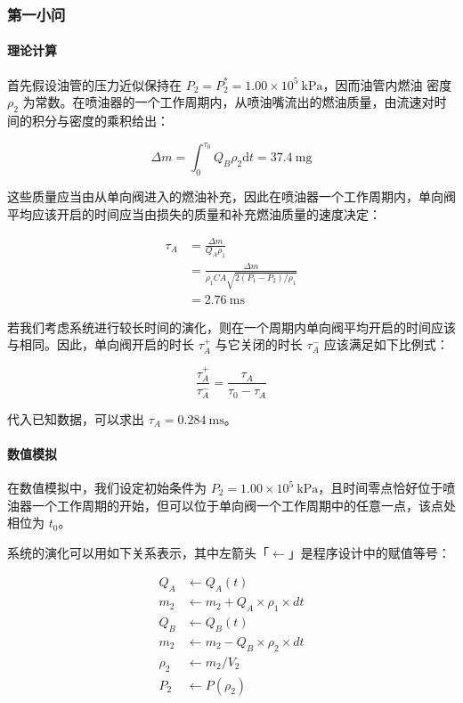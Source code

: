 \documentclass[18pt]{ctexart}
\newcommand{\prb}{\times 10^5~\mathrm{kPa}}
\newcommand{\tim}{~\mathrm{ms}}
\newcommand{\mas}{~\mathrm{mg}}
\begin{document}
\subsubsection{第一小问}
\paragraph{理论计算}
首先假设油管的压力近似保持在 $P_2=P_2^*=1.00\prb$，因而油管内燃油 密度 $\rho_2$ 为常数。在喷油器的一个工作周期内，从喷油嘴流出的燃油质量，由流速对时间的积分与密度的乘积给出：

$$
\Delta m=\int_0^{\tau_0}Q_B\rho_2\mathrm dt=37.4\mas
$$

这些质量应当由从单向阀进入的燃油补充，因此在喷油器一个工作周期内，单向阀平均应该开启的时间应当由损失的质量和补充燃油质量的速度决定：

$$
\begin{aligned}
\tau_A&=\frac{\Delta m}{Q_A\rho_1}\\
&=\frac{\Delta m}{\rho_1CA\sqrt{2(P_1-P_2)/\rho_1}}\\
&=2.76\tim
\end{aligned}
$$

若我们考虑系统进行较长时间的演化，则在一个周期内单向阀平均开启的时间应该与相同。因此，单向阀开启的时长 $\tau_A^+$ 与它关闭的时长 $\tau_A^-$ 应该满足如下比例式：

$$
\frac{\tau_A^+}{\tau_A^-}=\frac{\tau_A}{\tau_0-\tau_A}
$$

代入已知数据，可以求出 $\tau_A=0.284\tim$。

\paragraph{数值模拟}

在数值模拟中，我们设定初始条件为 $P_2=1.00\prb$，且时间零点恰好位于喷油器一个工作周期的开始，但可以位于单向阀一个工作周期中的任意一点，该点处相位为 $t_0$。

系统的演化可以用如下关系表示，其中左箭头「$\leftarrow$」是程序设计中的赋值等号：

$$
\begin{aligned}
    Q_A &\leftarrow Q_A(t)\\
    m_2 &\leftarrow m_2 + Q_A \times \rho_1 \times dt\\
    Q_B &\leftarrow Q_B(t)\\
    m_2 &\leftarrow m_2 - Q_B \times \rho_2 \times dt\\
    \rho_2 &\leftarrow m_2 / V_2\\
    P_2 &\leftarrow P(\rho_2)\\
\end{aligned}
$$
\end{document}
